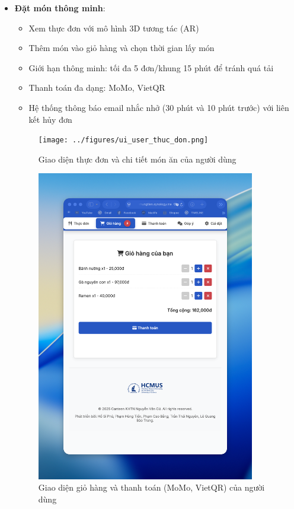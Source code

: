 \documentclass[12pt,a4paper]{article}
\begin{document}
\begin{itemize}[leftmargin=1cm]
    \item \textbf{Đặt món thông minh}:
        \begin{itemize}[leftmargin=0.5cm]
            \item Xem thực đơn với mô hình 3D tương tác (AR)
            \item Thêm món vào giỏ hàng và chọn thời gian lấy món
            \item Giới hạn thông minh: tối đa 5 đơn/khung 15 phút để tránh quá tải
            \item Thanh toán đa dạng: MoMo, VietQR
            \item Hệ thống thông báo email nhắc nhở (30 phút và 10 phút trước) với liên kết hủy đơn
        \end{itemize}
\begin{figure}[H]
    \centering
    \texttt{[image: ../figures/ui\_user\_thuc\_don.png]} %
    \caption{Giao diện thực đơn và chi tiết món ăn của người dùng}
    \label{fig:ui_user_menu}
\end{figure}
\begin{figure}[H]
    \centering
    \includegraphics[width=0.9\textwidth]{../figures/ui_user_gio_hang_thanh_toan.png} %
    \caption{Giao diện giỏ hàng và thanh toán (MoMo, VietQR) của người dùng}
    \label{fig:ui_user_cart_payment}
\end{figure}


\end{itemize}
\end{document}

